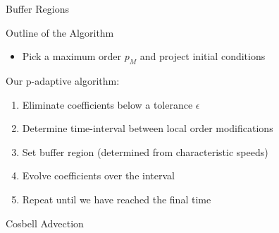 \documentclass[sansserif]{beamer}
\begin{document}
\begin{frame}{Buffer Regions}
\end{frame}

\begin{frame}{Outline of the Algorithm}
\begin{itemize}
 \item Pick a maximum order $p_M$ and project initial conditions
\end{itemize}
Our p-adaptive algorithm:
\begin{enumerate}
 \item Eliminate coefficients below a tolerance $\epsilon$
 \item Determine time-interval between local order modifications
 \item Set buffer region (determined from characteristic speeds)
 \item Evolve coefficients over the interval
 \item Repeat until we have reached the final time
\end{enumerate}
\end{frame}

\begin{frame}{Cosbell Advection}
\vspace{-0.7cm}
\begin{center}
\end{center}
\end{frame}
\end{document}
